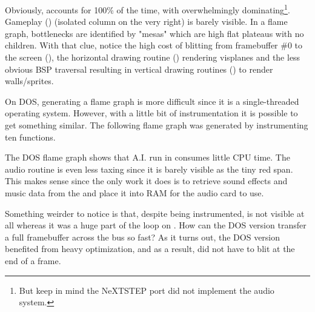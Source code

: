 \par
Obviously,  accounts for 100\% of the time, with  overwhelmingly dominating\footnote{But keep in mind the NeXTSTEP port did not implement the audio system.}. Gameplay () (isolated column on the very right) is barely visible. In a flame graph, bottlenecks are identified by "mesas" which are high flat plateaus with no children. With that clue, notice the high cost of blitting from framebuffer \#0 to the screen (), the horizontal drawing routine () rendering visplanes and the less obvious BSP traversal resulting in vertical drawing routines () to render walls/sprites.




On DOS, generating a flame graph is more difficult since it is a single-threaded operating system. However, with a little bit of instrumentation it is possible to get something similar. The following flame graph was generated by instrumenting ten functions.\\
\par
\vspace{4mm}
\par
The DOS flame graph shows that A.I. run in  consumes little CPU time. The audio routine  is even less taxing since it is barely visible as the tiny red span. This makes sense since the only work it does is to retrieve sound effects and music data from the  and place it into RAM for the audio card to use.\\
\par
 Something weirder to notice is that, despite being instrumented,  is not visible at all whereas it was a huge part of the loop on \NeXTns{}. How can the DOS version transfer a full framebuffer across the bus so fast? As it turns out, the DOS version benefited from heavy optimization, and as a result, did not have to blit at the end of a frame.\\
\par

